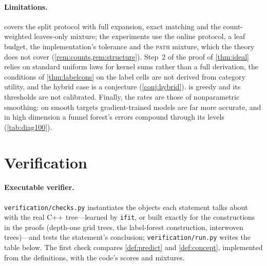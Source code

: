 \documentclass[11pt]{article}
\theoremstyle{definition}
\theoremstyle{remark}
\begin{document}
\paragraph{Limitations.}
 covers the split protocol with full expansion, exact matching and the
count-weighted leaves-only mixture; the experiments use the online protocol, a leaf
budget, the implementation's tolerance and the \textsc{path} mixture, which the theory
does not cover (\cref{rem:counts,rem:structure}).  Step~2 of the proof of
\cref{thm:ideal} relies on standard uniform laws for kernel sums rather than a full
derivation, the conditions of \cref{thm:labelcons} on the label cells are not derived
from category utility, and the hybrid case is a conjecture (\cref{conj:hybrid}).
 is greedy and its thresholds are not calibrated.  Finally, the
rates are those of nonparametric smoothing: on smooth targets gradient-trained models
are far more accurate, and in high dimension a funnel forest's errors compound through
its levels (\cref{tab:diag100}).

\appendix
\section{Verification}\label{app:verify}

\paragraph{Executable verifier.}
\texttt{verification/checks.py} instantiates the objects each statement talks about with
the real C++ tree---learned by \texttt{ifit}, or built exactly for the constructions in
the proofs (depth-one grid trees, the label-forest construction, interwoven trees)---and
tests the statement's conclusion; \texttt{verification/run.py} writes the table below.
The first check compares \cref{def:predict} and \cref{def:concept}, implemented from the
definitions, with the code's scores and mixtures.

\end{document}
